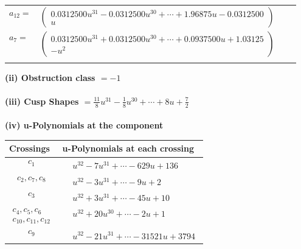 \documentclass[1p]{elsarticle_modified}
\theoremstyle{definition}
\begin{document}
\begin{tabular}{m{7pt} m{180pt} m{7pt} m{180pt} }
\flushright $a_{12}=$&$\begin{pmatrix}0.0312500 u^{31}-0.0312500 u^{30}+\cdots+1.96875 u-0.0312500\\u\end{pmatrix}$ \\
\flushright $a_{7}=$&$\begin{pmatrix}0.0312500 u^{31}+0.0312500 u^{30}+\cdots+0.0937500 u+1.03125\\- u^2\end{pmatrix}$\\&\end{tabular}
\flushleft \textbf{(ii) Obstruction class $= -1$}\\~\\
\flushleft \textbf{(iii) Cusp Shapes $= \frac{11}{8} u^{31}-\frac{1}{8} u^{30}+\cdots+8 u+\frac{7}{2}$}\\~\\
\newpage\renewcommand{\arraystretch}{1}
\flushleft \textbf{(iv) u-Polynomials at the component}\newline \\
\begin{tabular}{m{50pt}|m{274pt}}
Crossings & \hspace{64pt}u-Polynomials at each crossing \\
\hline $$\begin{aligned}c_{1}\end{aligned}$$&$\begin{aligned}
&u^{32}-7 u^{31}+\cdots-629 u+136
\end{aligned}$\\
\hline $$\begin{aligned}c_{2},c_{7},c_{8}\end{aligned}$$&$\begin{aligned}
&u^{32}-3 u^{31}+\cdots-9 u+2
\end{aligned}$\\
\hline $$\begin{aligned}c_{3}\end{aligned}$$&$\begin{aligned}
&u^{32}+3 u^{31}+\cdots-45 u+10
\end{aligned}$\\
\hline $$\begin{aligned}c_{4},c_{5},c_{6}\\c_{10},c_{11},c_{12}\end{aligned}$$&$\begin{aligned}
&u^{32}+20 u^{30}+\cdots-2 u+1
\end{aligned}$\\
\hline $$\begin{aligned}c_{9}\end{aligned}$$&$\begin{aligned}
&u^{32}-21 u^{31}+\cdots-31521 u+3794
\end{aligned}$\\
\hline
\end{tabular}\\~\\
\end{document}
